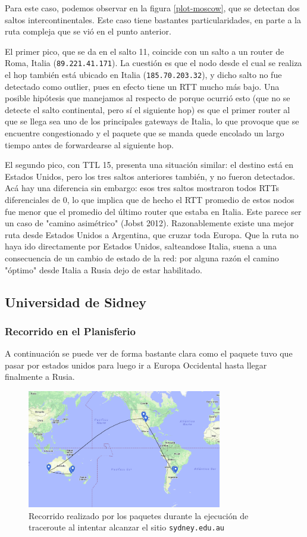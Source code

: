 Para este caso, podemos observar en la figura \ref{plot-moscow}, que se detectan dos saltos intercontinentales. Este caso tiene bastantes particularidades, en parte a la ruta compleja que se vió en el punto anterior. 

El primer pico, que se da en el salto 11, coincide con un salto a un router de Roma, Italia (\texttt{89.221.41.171}). La cuestión es que el nodo desde el cual se realiza el hop también está ubicado en Italia (\texttt{185.70.203.32}), y dicho salto no fue detectado como outlier, pues en efecto tiene un RTT mucho más bajo. Una posible hipótesis que manejamos al respecto de porque ocurrió esto (que no se detecte el salto continental, pero sí el siguiente hop) es que el primer router al que se llega sea uno de los principales gateways de Italia, lo que provoque que se encuentre congestionado y el paquete que se manda quede encolado un largo tiempo antes de forwardearse al siguiente hop. 

El segundo pico, con TTL 15, presenta una situación similar: el destino está en Estados Unidos, pero los tres saltos anteriores también, y no fueron detectados. Acá hay una diferencia sin embargo: esos tres saltos mostraron todos RTTs diferenciales de 0, lo que implica que de hecho el RTT promedio de estos nodos fue menor que el promedio del último router que estaba en Italia. Este parece ser un caso de "camino asimétrico" (Jobst 2012). Razonablemente existe una mejor ruta desde Estados Unidos a Argentina, que cruzar toda Europa. Que la ruta no haya ido directamente por Estados Unidos, salteandose Italia, suena a una consecuencia de un cambio de estado de la red: por alguna razón el camino "óptimo" desde Italia a Rusia dejo de estar habilitado.

\subsection*{Universidad de Sidney}

\subsubsection*{Recorrido en el Planisferio}

A continuación se puede ver de forma bastante clara como el paquete tuvo que pasar por estados unidos para luego ir a Europa Occidental hasta llegar finalmente a Rusia.

\begin{figure}[H]
  \centering
  \includegraphics[width=8.5cm]{figs/sidney.png}
  \caption{\footnotesize Recorrido realizado por los paquetes durante la ejecución de traceroute al intentar alcanzar el sitio \texttt{sydney.edu.au}}
\end{figure}

